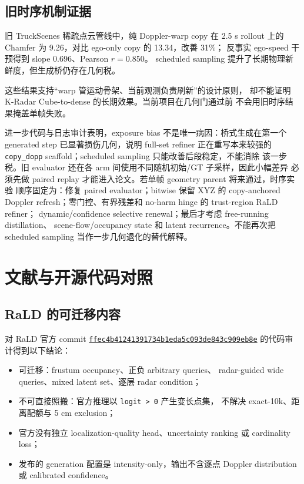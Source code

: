 \documentclass[11pt,a4paper,fontset=none]{ctexart}
\newcommand{\code}[1]{\texttt{#1}}
\begin{document}
\subsection{旧时序机制证据}

旧 TruckScenes 稀疏点云管线中，纯 Doppler-warp copy 在 2.5 s rollout
上的 Chamfer 为 9.26，对比 ego-only copy 的 13.34，改善 31\%；
反事实 ego-speed 干预得到 slope 0.696、Pearson $r=0.850$。
scheduled sampling 提升了长期物理新鲜度，但生成桥仍存在几何税。

这些结果支持“warp 管运动骨架、当前观测负责刷新”的设计原则，
却不能证明 K-Radar Cube-to-dense 的长期效果。当前项目在几何门通过前
不会用旧时序结果掩盖单帧失败。

进一步代码与日志审计表明，exposure bias 不是唯一病因：桥式生成在第一个
generated step 已显著损伤几何，说明 full-set refiner 正在重写本来较强的
\code{copy\_dopp} scaffold；scheduled sampling 只能改善后段稳定，不能消除
该一步税。旧 evaluator 还在各 arm 间使用不同随机初始/GT 子采样，因此小幅差异
必须先做 paired replay 才能进入论文。若单帧 geometry parent 将来通过，时序实验
顺序固定为：修复 paired evaluator；bitwise 保留 XYZ 的 copy-anchored Doppler
refresh；零门控、有界残差和 no-harm hinge 的 trust-region RaLD refiner；
dynamic/confidence selective renewal；最后才考虑 free-running distillation、
scene-flow/occupancy state 和 latent recurrence。不能再次把 scheduled sampling
当作一步几何退化的替代解释。

\section{文献与开源代码对照}

\subsection{RaLD 的可迁移内容}

对 RaLD 官方 commit
\href{https://github.com/MetaIoT-WHU/RaLD/tree/ffec4b41241391734b1eda5c093de843c909eb8e}
{\code{ffec4b41241391734b1eda5c093de843c909eb8e}}
的代码审计得到以下结论：
\begin{itemize}
  \item 可迁移：frustum occupancy、正负 arbitrary queries、
  radar-guided wide queries、mixed latent set、逐层 radar condition；
  \item 不可直接照搬：官方推理以 \code{logit > 0} 产生变长点集，
  不解决 exact-10k、距离配额与 5 cm exclusion；
  \item 官方没有独立 localization-quality head、uncertainty ranking
  或 cardinality loss；
  \item 发布的 generation 配置是 intensity-only，输出不含逐点
  Doppler distribution 或 calibrated confidence。
\end{itemize}
\end{document}
